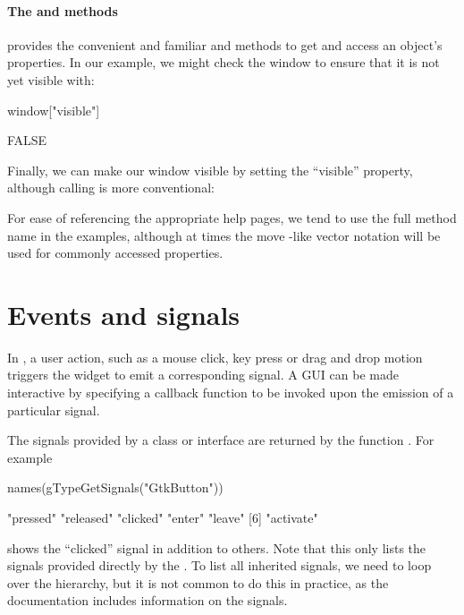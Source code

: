 \paragraph{The \code{[} and \code{[\ASSIGN} methods}
 provides the convenient and familiar \code{[} and
\code{[\ASSIGN} methods to get and access an object's properties. In our example,
we might check the window to ensure that it is not yet visible with:
\begin{Schunk}
\begin{Sinput}
 window["visible"]
\end{Sinput}
\begin{Soutput}
[1] FALSE
\end{Soutput}
\end{Schunk}
Finally, we can make our window visible by setting the ``visible'' property,
although calling  is more conventional:
\begin{Schunk}
\end{Schunk}

For ease of referencing the appropriate help pages, we tend to use the
full method name in the examples, although at times the move \R-like
vector notation will be used for commonly accessed properties.


\section{Events and signals}

In , a user action, such as a mouse click, key press or
drag and drop motion triggers the widget to emit a corresponding
signal.  A GUI can be made interactive by specifying a callback
function to be invoked upon the emission of a particular signal.

The signals provided by a class or interface are returned by the
function . For example
\begin{Schunk}
\begin{Sinput}
 names(gTypeGetSignals("GtkButton"))
\end{Sinput}
\begin{Soutput}
[1] "pressed"  "released" "clicked"  "enter"    "leave"   
[6] "activate"
\end{Soutput}
\end{Schunk}
shows the ``clicked'' signal in addition to others. Note that this
only lists the signals provided directly by the . To
list all inherited signals, we need to loop over the hierarchy, but it
is not common to do this in practice, as the documentation includes
information on the signals.

